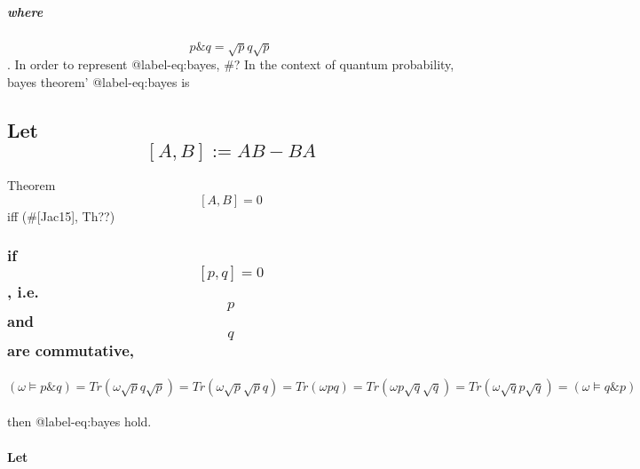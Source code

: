 \hypertarget{where}{%
\subparagraph{where}\label{where}}

\[p \& q = \sqrt{p}q\sqrt{p}\]. In order to represent @label-eq:bayes,
\#? In the context of quantum probability, bayes theorem'
@label-eq:bayes is

\hypertarget{let-a-b-ab---ba}{%
\subsection{\texorpdfstring{Let
\[[A, B] := AB - BA\]}{Let {[}A, B{]} := AB - BA}}\label{let-a-b-ab---ba}}

Theorem \[[A,B] =0\] iff (\#{[}Jac15{]}, Th??)

\hypertarget{if-pq-0-i.e.-p-and-q-are-commutative}{%
\subsubsection{\texorpdfstring{if \[[p,q] = 0\], i.e. \[p\] and \[q\]
are
commutative,}{if {[}p,q{]} = 0, i.e. p and q are commutative,}}\label{if-pq-0-i.e.-p-and-q-are-commutative}}

\hypertarget{omega-vdash-p-q-tromega-sqrt-p-q-sqrt-p-tromega-sqrt-p-sqrt-p-q-tromega-p-q-tromega-p-sqrt-q-sqrt-q-tromega-sqrt-q-p-sqrt-q-omega-vdash-q-p}{%
\paragraph{\texorpdfstring{\[(\omega \vDash p \& q) = Tr(\omega \sqrt p q \sqrt p) = Tr(\omega \sqrt p \sqrt p q) = Tr(\omega p q) = Tr(\omega p \sqrt q \sqrt q) = Tr(\omega  \sqrt q p \sqrt q) = (\omega \vDash q \& p)\]}{(\textbackslash{}omega \textbackslash{}vDash p \textbackslash{}\& q) = Tr(\textbackslash{}omega \textbackslash{}sqrt p q \textbackslash{}sqrt p) = Tr(\textbackslash{}omega \textbackslash{}sqrt p \textbackslash{}sqrt p q) = Tr(\textbackslash{}omega p q) = Tr(\textbackslash{}omega p \textbackslash{}sqrt q \textbackslash{}sqrt q) = Tr(\textbackslash{}omega  \textbackslash{}sqrt q p \textbackslash{}sqrt q) = (\textbackslash{}omega \textbackslash{}vDash q \textbackslash{}\& p)}}\label{omega-vdash-p-q-tromega-sqrt-p-q-sqrt-p-tromega-sqrt-p-sqrt-p-q-tromega-p-q-tromega-p-sqrt-q-sqrt-q-tromega-sqrt-q-p-sqrt-q-omega-vdash-q-p}}

then @label-eq:bayes hold.

\hypertarget{let}{%
\paragraph{Let}\label{let}}


